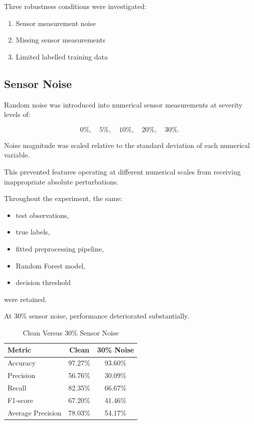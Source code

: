 \documentclass[conference]{IEEEtran}
\begin{document}
Three robustness conditions were investigated:

\begin{enumerate}

    \item Sensor measurement noise
    \item Missing sensor measurements
    \item Limited labelled training data

\end{enumerate}

\subsection{Sensor Noise}

Random noise was introduced into numerical sensor measurements at severity levels of:

\[
0\%,\quad
5\%,\quad
10\%,\quad
20\%,\quad
30\%.
\]

Noise magnitude was scaled relative to the standard deviation of each numerical variable.

This prevented features operating at different numerical scales from receiving inappropriate absolute perturbations.

Throughout the experiment, the same:

\begin{itemize}

    \item test observations,
    \item true labels,
    \item fitted preprocessing pipeline,
    \item Random Forest model,
    \item decision threshold

\end{itemize}

were retained.

At 30\% sensor noise, performance deteriorated substantially.

\begin{table}[htbp]

\caption{Clean Versus 30\% Sensor Noise}

\centering

\begin{tabular}{lcc}

\toprule

\textbf{Metric} &
\textbf{Clean} &
\textbf{30\% Noise}\\

\midrule

Accuracy & 97.27\% & 93.60\%\\
Precision & 56.76\% & 30.09\%\\
Recall & 82.35\% & 66.67\%\\
F1-score & 67.20\% & 41.46\%\\
Average Precision & 78.03\% & 54.17\%\\

\bottomrule

\end{tabular}

\end{table}
\end{document}
